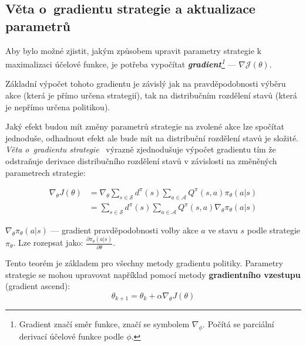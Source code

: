 \pagebreak

\subsection{Věta o~gradientu strategie a aktualizace parametrů}
Aby bylo možné zjistit, jakým způsobem upravit parametry strategie k maximalizaci účelové funkce, je potřeba vypočítat \emph{\textbf{gradient}\footnote[2]{Gradient značí směr funkce, značí se symbolem $\nabla_{\phi}$. Počítá se parciální derivací účelové funkce podle $\phi$.}} --- $\nabla \mathcal{J}(\theta)$.

Základní výpočet tohoto gradientu je závislý jak na pravděpodobnosti výběru akce (která je přímo určena strategií), tak na distribučním rozdělení stavů (která je nepřímo určena politikou).

Jaký efekt budou mít změny parametrů strategie na zvolené akce lze spočítat jednoduše, odhadnout efekt ale bude mít na distribuční rozdělení stavů je složité.\\
\emph{Věta o~gradientu strategie}~\cite{NIPS1999_464d828b} výrazně zjednodušuje výpočet gradientu tím že odstraňuje derivace distribučního rozdělení stavů v závislosti na změněných parametrech strategie:

\begin{equation}
    \label{eq:veta_o_gradientu_strategie}
    \begin{split}
        \nabla_\theta J(\theta) 
        &= \nabla_\theta \sum_{s \in \mathcal{S}} d^\pi(s) \sum_{a \in \mathcal{A}} Q^\pi(s, a) \pi_\theta(a \vert s) \\
        &= \sum_{s \in \mathcal{S}} d^\pi(s) \sum_{a \in \mathcal{A}} Q^\pi(s, a) \nabla_\theta \pi_\theta(a \vert s) 
    \end{split}
\end{equation}

\begin{myitemize}
  \item $\nabla_\theta \pi_\theta(a \vert s)$ --- gradient pravděpodobnosti volby akce $a$ ve stavu $s$ podle strategie $\pi_\theta$.
  Lze rozepsat jako: $\frac{\partial \pi_\theta(a \vert s)}{\partial \theta}$.
\end{myitemize}

Tento teorém je základem pro všechny metody gradientu politiky.
Parametry strategie se mohou upravovat například pomocí metody \textbf{gradientního  vzestupu} (gradient ascend):
\begin{equation}
  \theta_{k+1} = \theta_k + \alpha \nabla_\theta J(\theta)
\end{equation}

